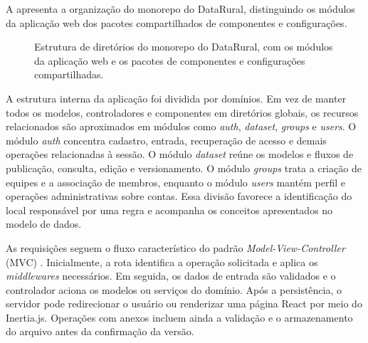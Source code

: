 A  apresenta a organização do monorepo do DataRural, distinguindo os módulos da aplicação web dos pacotes compartilhados de componentes e configurações.

\begin{figure}[!htbp]
    \centering
    \begin{minipage}{\textwidth}
    \small
{}
    \end{minipage}
    \caption{Estrutura de diretórios do monorepo do DataRural, com os módulos da aplicação web e os pacotes de componentes e configurações compartilhadas.}
    \label{fig:estrutura_monorepo}
\end{figure}
\FloatBarrier

A estrutura interna da aplicação foi dividida por domínios. Em vez de manter todos os modelos, controladores e componentes em diretórios globais, os recursos relacionados são aproximados em módulos como \textit{auth}, \textit{dataset}, \textit{groups} e \textit{users}. O módulo \textit{auth} concentra cadastro, entrada, recuperação de acesso e demais operações relacionadas à sessão. O módulo \textit{dataset} reúne os modelos e fluxos de publicação, consulta, edição e versionamento. O módulo \textit{groups} trata a criação de equipes e a associação de membros, enquanto o módulo \textit{users} mantém perfil e operações administrativas sobre contas. Essa divisão favorece a identificação do local responsável por uma regra e acompanha os conceitos apresentados no modelo de dados.

As requisições seguem o fluxo característico do padrão \textit{Model-View-Controller} (MVC) \cite{krasner1988mvc}. Inicialmente, a rota identifica a operação solicitada e aplica os \textit{middlewares} necessários. Em seguida, os dados de entrada são validados e o controlador aciona os modelos ou serviços do domínio. Após a persistência, o servidor pode redirecionar o usuário ou renderizar uma página React por meio do Inertia.js. Operações com anexos incluem ainda a validação e o armazenamento do arquivo antes da confirmação da versão.

